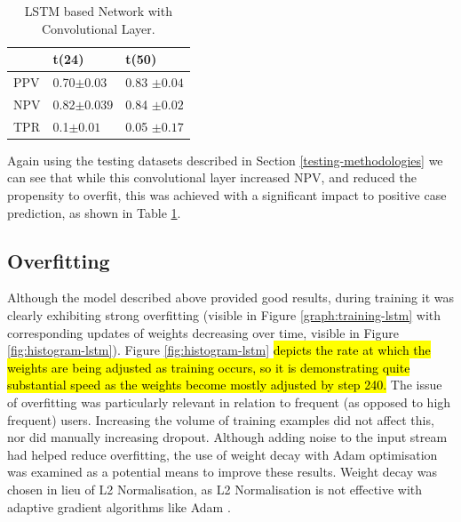 \begin{table}[ht]
\setlength{\tabcolsep}{8pt}
\centering
\caption{LSTM based Network with Convolutional Layer.}
\label{table:cnn-lstm-results}
\begin{tabular}{@{}lll@{}}
\toprule
\textbf{}                & \textbf{t(24)} & \textbf{t(50)} \\ \midrule
\multicolumn{1}{l|}{PPV} & 0.70$\pm 0.03$         & 0.83 $\pm 0.04$         \\
\multicolumn{1}{l|}{NPV} & 0.82$\pm 0.039$         & 0.84 $\pm 0.02$         \\
\multicolumn{1}{l|}{TPR} & 0.1$\pm 0.01$         & 0.05 $\pm 0.17$         \\
 \bottomrule
\end{tabular}
\end{table}


Again using the testing datasets described in Section \ref{testing-methodologies} we can see that while this convolutional layer increased NPV, and reduced the propensity to overfit, this was achieved with a significant impact to positive case prediction, as shown in Table \ref{table:cnn-lstm-results}.  






\subsection{Overfitting}

Although the model described above provided good results, during training it was clearly exhibiting strong overfitting (visible in Figure \ref{graph:training-lstm} with corresponding updates of weights decreasing over time, visible in Figure \ref{fig:histogram-lstm}). Figure \ref{fig:histogram-lstm} \hl{depicts the rate at which the weights are being adjusted as training occurs, so it is demonstrating quite substantial speed as the weights become mostly adjusted by step 240.} The issue of overfitting was particularly relevant in relation to frequent (as opposed to high frequent) users. Increasing the volume of training examples did not affect this, nor did manually increasing dropout. Although adding noise to the input stream had helped reduce overfitting, the use of weight decay with Adam optimisation was examined as a potential means to improve these results. Weight decay was chosen in lieu of L2 Normalisation, as L2 Normalisation is not effective with adaptive gradient algorithms like Adam \cite{loshchilov2017fixing}.     

